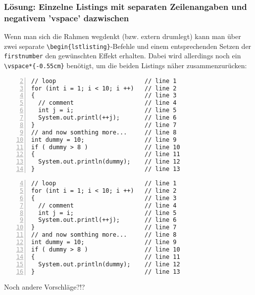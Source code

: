 \documentclass[a4paper,10pt]{article}
\begin{document}
\subsubsection*{Lösung: Einzelne Listings mit separaten Zeilenangaben und negativem 'vspace' dazwischen}
Wenn man sich die Rahmen wegdenkt (bzw. extern drumlegt) kann man über zwei separate \texttt{\verb|\begin{lstlisting}|}-Befehle und einem entsprechenden Setzen der \texttt{\verb|firstnumber|} den gewünschten Effekt erhalten. Dabei wird allerdings noch ein \texttt{\verb|\vspace*{-0.55cm}|} benötigt, um die beiden Listings näher zusammenzurücken:

\begin{lstlisting}[numbers=left, frame=single, linerange={2-2}, firstnumber=2]
// loop                         // line 1
for (int i = 1; i < 10; i ++)   // line 2
{                               // line 3
  // comment                    // line 4
  int j = i;                    // line 5
  System.out.printl(++j);       // line 6
}                               // line 7
// and now somthing more...     // line 8
int dummy = 10;                 // line 9
if ( dummy > 8 )                // line 10
{                               // line 11
  System.out.println(dummy);    // line 12
}                               // line 13
\end{lstlisting}
\vspace*{-0.55cm}
\begin{lstlisting}[numbers=left, frame=single, linerange={4-6},firstnumber=4]
// loop                         // line 1
for (int i = 1; i < 10; i ++)   // line 2
{                               // line 3
  // comment                    // line 4
  int j = i;                    // line 5
  System.out.printl(++j);       // line 6
}                               // line 7
// and now somthing more...     // line 8
int dummy = 10;                 // line 9
if ( dummy > 8 )                // line 10
{                               // line 11
  System.out.println(dummy);    // line 12
}                               // line 13
\end{lstlisting}

\noindent Noch andere Vorschläge?!?
\end{document}
